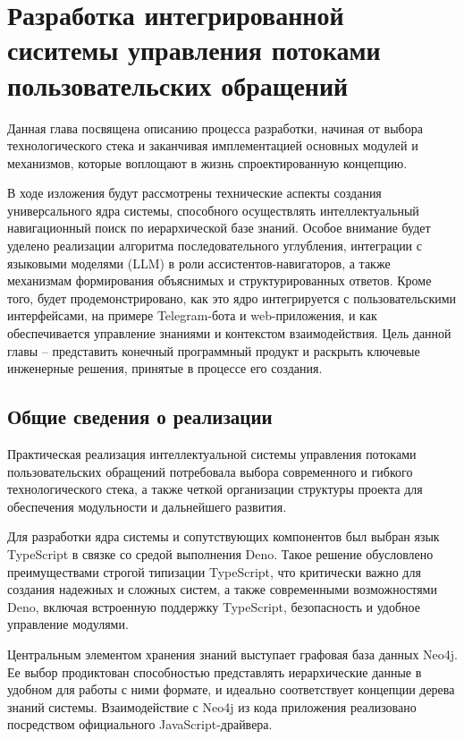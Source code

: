 \section{Разработка интегрированной сиситемы управления потоками пользовательских обращений}
\label{sec:development}

Данная глава посвящена описанию процесса разработки, начиная от выбора технологического стека и заканчивая имплементацией основных модулей и механизмов, которые воплощают в жизнь спроектированную концепцию.

В ходе изложения будут рассмотрены технические аспекты создания универсального ядра системы, способного осуществлять интеллектуальный навигационный поиск по иерархической базе знаний. Особое внимание будет уделено реализации алгоритма последовательного углубления, интеграции с языковыми моделями (LLM) в роли ассистентов-навигаторов, а также механизмам формирования объяснимых и структурированных ответов. Кроме того, будет продемонстрировано, как это ядро интегрируется с пользовательскими интерфейсами, на примере Telegram-бота и web-приложения, и как обеспечивается управление знаниями и контекстом взаимодействия. Цель данной главы -- представить конечный программный продукт и раскрыть ключевые инженерные решения, принятые в процессе его создания.

\subsection{Общие сведения о реализации}

Практическая реализация интеллектуальной системы управления потоками пользовательских обращений потребовала выбора современного и гибкого технологического стека, а также четкой организации структуры проекта для обеспечения модульности и дальнейшего развития.

Для разработки ядра системы и сопутствующих компонентов был выбран язык TypeScript\cite{TypeScript} в связке со средой выполнения Deno. Такое решение обусловлено преимуществами строгой типизации TypeScript, что критически важно для создания надежных и сложных систем, а также современными возможностями Deno, включая встроенную поддержку TypeScript, безопасность и удобное управление модулями.

Центральным элементом хранения знаний выступает графовая база данных Neo4j. Ее выбор продиктован способностью представлять иерархические данные в удобном для работы с ними формате, и идеально соответствует концепции дерева знаний системы. Взаимодействие с Neo4j из кода приложения реализовано посредством официального JavaScript-драйвера.

